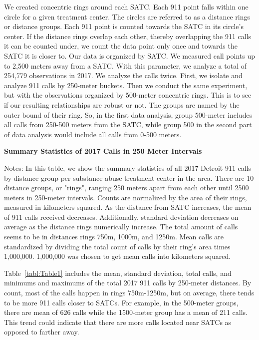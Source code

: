 \documentclass[12pt]{article}
\begin{document}
We created concentric rings around each SATC. Each 911 point falls within one circle for a given treatment center.  The circles are referred to as a distance rings or distance groups. Each 911 point is counted towards the SATC in its circle's center. If the distance rings overlap each other, thereby overlapping the 911 calls it can be counted under, we count the data point only once and towards the SATC it is closer to. Our data is organized by SATC. We measured call points up to 2,500 meters away from a SATC. With this parameter, we analyze a total of 254,779 observations in 2017. We analyze the calls twice. First, we isolate and analyze 911 calls by 250-meter buckets. Then we conduct the same experiment, but with the observations organized by 500-meter concentric rings. This is to see if our resulting  relationships are robust or not. The groups are named by the outer bound of their ring. So, in the first data analysis, group 500-meter includes all calls from 250-500 meters from the SATC, while group 500 in the second part of data analysis would include all calls from 0-500 meters. 
\begin{table}[H]
\centering
\scalebox{0.8}{
\centering

}
\caption{\textbf{Summary Statistics of 2017 Calls in 250 Meter Intervals}}
\label{tabl:Table1}
\centering\small{Notes: In this table, we show the summary statistics of all 2017 Detroit 911 calls by distance group per substance abuse treatment center in the area. There are 10 distance groups, or "rings", ranging 250 meters apart from each other until 2500 meters in 250-meter intervals. Counts are normalized by the area of their rings, measured in kilometers squared. As the distance from SATC increases, the mean of 911 calls received decreases. Additionally, standard deviation decreases on average as the distance rings numerically increase. The total amount of calls seems to be in distances rings 750m, 1000m, and 1250m. Mean calls are standardized by dividing the total count of calls by their ring's area times 1,000,000. 1,000,000 was chosen to get mean calls into kilometers squared.}
\end{table}  

Table~\ref{tabl:Table1} includes the mean, standard deviation, total calls, and minimums and maximums of the total 2017 911 calls by 250-meter distances. By count, most of the calls happen in rings 750m-1250m, but on average, there tends to be more 911 calls closer to SATCs. For example, in the 500-meter groups, there are mean of 626 calls while the 1500-meter group has a mean of 211 calls. This trend could indicate that there are more calls located near SATCs as opposed to farther away. 
\end{document}

